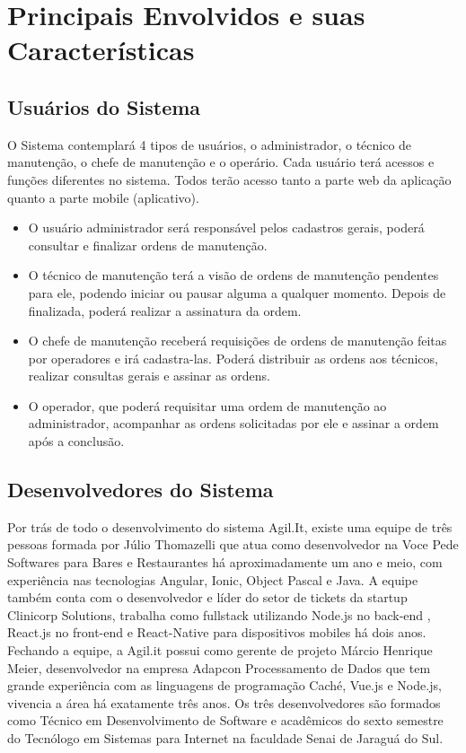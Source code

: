 \section{Principais Envolvidos e suas Características}

\subsection{Usuários do Sistema}
O Sistema contemplará 4 tipos de usuários, o administrador, o técnico de manutenção, o chefe de manutenção e o operário. Cada usuário terá acessos e funções diferentes no sistema. Todos terão acesso tanto a parte web da aplicação quanto a parte mobile (aplicativo).

\begin{itemize}
	
	\item O usuário administrador será responsável pelos cadastros gerais, poderá consultar e finalizar ordens de manutenção.
	
	\item O técnico de manutenção terá a visão de ordens de manutenção pendentes para ele, podendo iniciar ou pausar alguma a qualquer momento. Depois de finalizada, poderá realizar a assinatura da ordem.
	
	\item O chefe de manutenção receberá requisições de ordens de manutenção feitas por operadores e irá cadastra-las. Poderá distribuir as ordens aos técnicos, realizar consultas gerais e assinar as ordens.
	
	\item O operador, que poderá requisitar uma ordem de manutenção ao administrador, acompanhar as ordens solicitadas por ele e assinar a ordem após a conclusão.
	
\end{itemize}
\subsection{Desenvolvedores do Sistema}

Por trás de todo o desenvolvimento do sistema Agil.It, existe uma equipe de três pessoas formada por Júlio Thomazelli que atua como desenvolvedor na Voce Pede Softwares para Bares e Restaurantes há aproximadamente um ano e meio, com experiência nas tecnologias Angular, Ionic, Object Pascal e Java. A equipe também conta com o desenvolvedor e líder do setor de tickets da startup Clinicorp Solutions, trabalha como fullstack utilizando Node.js no back-end , React.js no front-end e React-Native para dispositivos mobiles há dois anos. Fechando a equipe, a Agil.it possui como gerente de projeto Márcio Henrique Meier, desenvolvedor na empresa Adapcon Processamento de Dados que tem grande experiência com as linguagens de programação Caché, Vue.js e Node.js, vivencia a área há exatamente três anos.
Os três desenvolvedores são formados como Técnico em Desenvolvimento de Software e acadêmicos do sexto semestre do Tecnólogo em Sistemas para Internet na faculdade Senai de Jaraguá do Sul.

